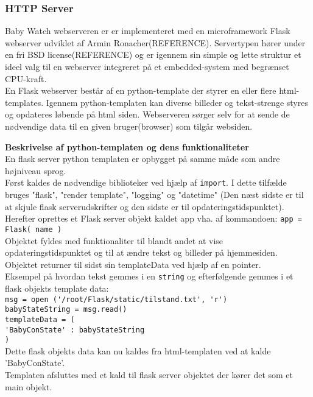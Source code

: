 \subsubsection*{HTTP Server}

Baby Watch webserveren er er implementeret med en microframework Flask  webserver udviklet af Armin Ronacher(REFERENCE). Servertypen hører under en fri BSD license(REFERENCE) og er igennem sin simple og lette struktur et ideel valg til en webserver integreret på et embedded-system med begrænset CPU-kraft. \\
En Flask webserver består af en python-template der styrer en eller flere html-templates. Igennem python-templaten kan diverse billeder og tekst-strenge styres og opdateres løbende på html siden. Webserveren sørger selv for at sende de nødvendige data til en given bruger(browser) som tilgår websiden. 

\textbf{Beskrivelse af python-templaten og dens funktionaliteter}\\
En flask server python templaten er opbygget på samme måde som andre højniveau sprog. \\
Først kaldes de nødvendige biblioteker ved hjælp af \verb+import+. I dette tilfælde bruges "flask", "render template", "logging" og "datetime" (Den næst sidste er til at skjule flask serverudskrifter og den sidste er til opdateringstidspunktet). \\ Herefter oprettes et Flask server objekt kaldet app vha. af kommandoen: \verb+app = Flask( name )+ \\ Objektet fyldes med funktionaliter til blandt andet at vise opdateringstidspunktet og til at ændre tekst og billeder på hjemmesiden. Objektet returner til sidst sin templateData ved hjælp af en pointer. \\
Eksempel på hvordan tekst gemmes i en \verb+string+ og efterfølgende gemmes i et flask objekts template data: \\
 \verb+msg = open ('/root/Flask/static/tilstand.txt', 'r')+ \\
   \verb+babyStateString = msg.read()+ \\
   \verb+templateData = (+ \\
      \verb+'BabyConState' : babyStateString+\\
      \verb+)+ \\ Dette flask objekts data kan nu kaldes fra html-templaten ved at kalde 'BabyConState'. \\
Templaten afsluttes med et kald til flask server objektet der kører det som et main objekt. \\
\vspace{5mm}

